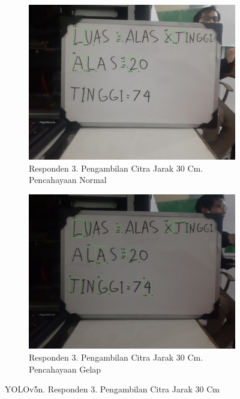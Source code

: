 \begin{figure}[H]
  \begin{subfigure}{.5\textwidth}
    \centering
    \captionsetup{width=.8\linewidth}
    \includegraphics[width=.8\linewidth]{gambar/yolov5n/responden3/hans30cm00-result.jpg}
    \caption{Responden 3. Pengambilan Citra Jarak 30 Cm. Pencahayaan Normal}
    \label{fig:nr3tcitra30cm}
  \end{subfigure}%
  \begin{subfigure}{.5\textwidth}
    \centering
    \captionsetup{width=.8\linewidth}
    \includegraphics[width=.8\linewidth]{gambar/yolov5n/responden3/hans30cm10-result.jpg}
    \caption{Responden 3. Pengambilan Citra Jarak 30 Cm. Pencahayaan Gelap}
    \label{fig:nr3gcitra30cm}
  \end{subfigure}
  \caption{YOLOv5n. Responden 3. Pengambilan Citra Jarak 30 Cm}
  \label{fig:nr3citra30cm}
\end{figure}

